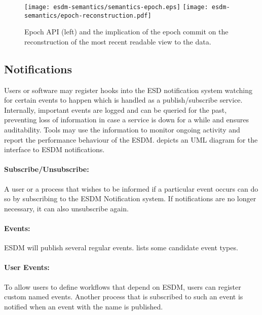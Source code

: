 \begin{figure}
	\centering
	\texttt{[image: esdm-semantics/semantics-epoch.eps]}
	\texttt{[image: esdm-semantics/epoch-reconstruction.pdf]}
	\caption{Epoch API (left) and the implication of the epoch commit on the reconstruction of the most recent readable view to the data.}
	\label{fig:epoch semantics}
\end{figure}






\subsection{Notifications}
\label{sec: viewpoints/logical/data model/notification}

Users or software may register hooks into the ESD notification system watching for certain events to happen which is handled as a publish/subscribe service.
Internally, important events are logged and can be queried for the past, preventing loss of information in case a service is down for a while and ensures auditability.
Tools may use the information to monitor ongoing activity and report the performance behaviour of the ESDM.
 depicts an UML diagram for the interface to ESDM notifications.


\paragraph{Subscribe/Unsubscribe:}
A user or a process that wishes to be informed if a particular event occurs can do so by subscribing to the ESDM Notification system. If notifications are no longer necessary, it can also unsubscribe again.

\paragraph{Events:}
ESDM will publish several regular events.  lists some candidate event types.

\paragraph{User Events:}
To allow users to define workflows that depend on ESDM, users can register custom named events. Another process that is subscribed to such an event is notified when an event with the name is published.


